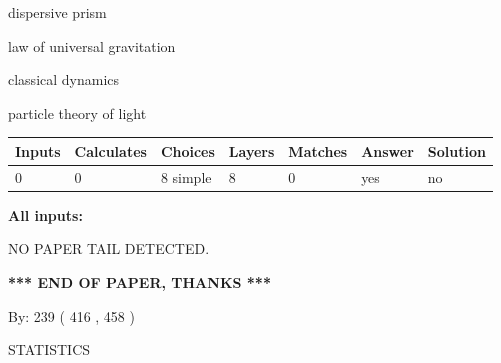 \documentclass[12pt]{article}
\begin{document}
 
dispersive prism
 
 
law of universal gravitation
 
 
classical dynamics
 
 
particle theory of light
 
 
\noindent{}
 
 
   
   
   
   
\noindent\begin{tabular}{|l|l|l|l|l|l|l|}
 \hline
Inputs & Calculates & Choices & Layers & Matches & Answer & Solution \\ \hline
 0  & 
 0  & 
 8
  simple  
  & 
 8  & 
 0  & 
  yes & 
  no 
  \\ \hline
 \end{tabular}
   
   
   
   
\noindent{}
   
   
   
   
\noindent\vspace{0.1in}\hspace{-0.08in} {\textbf{\Large{All inputs: }}}
   
   
   
   
\vspace{2.0in} NO PAPER TAIL DETECTED.
   
   
   
   
\vspace{1.0in} 
{\textbf{\large{ *** END OF PAPER, THANKS *** }}} 
   
   
\hspace{1.0in} By: 
 239 ( 416 ,  458 )
   
   
   
\vspace{0.2in}
\vspace{0.2in}
   
   
 \newpage
\setcounter{page}{1} 
   
   
 {\LARGE{STATISTICS}}
   
\vspace{0.2in}
   
\end{document}
